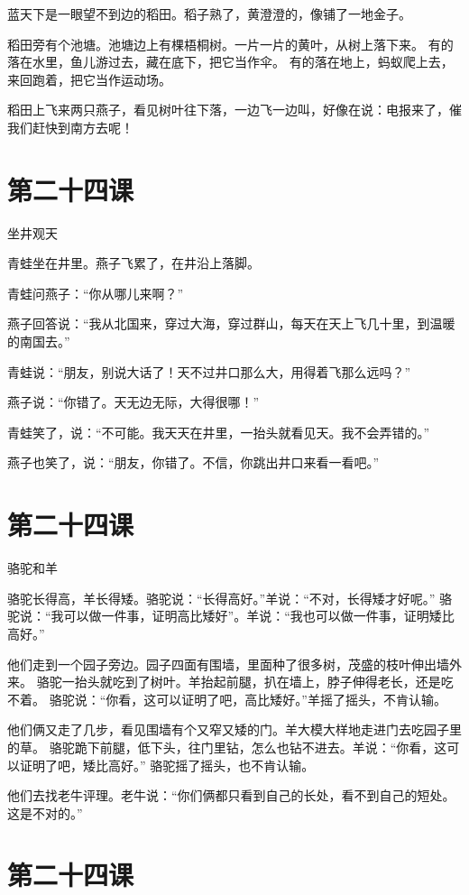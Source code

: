 \documentclass[12pt,UTF8]{ctexbook}
\begin{document}
蓝天下是一眼望不到边的稻田。稻子熟了，黄澄澄的，像铺了一地金子。

稻田旁有个池塘。池塘边上有棵梧桐树。一片一片的黄叶，从树上落下来。
有的落在水里，鱼儿游过去，藏在底下，把它当作伞。
有的落在地上，蚂蚁爬上去，来回跑着，把它当作运动场。

稻田上飞来两只燕子，看见树叶往下落，一边飞一边叫，好像在说：电报来了，催我们赶快到南方去呢！

\section{第二十四课}

坐井观天

青蛙坐在井里。燕子飞累了，在井沿上落脚。

青蛙问燕子：“你从哪儿来啊？”

燕子回答说：“我从北国来，穿过大海，穿过群山，每天在天上飞几十里，到温暖的南国去。”

青蛙说：“朋友，别说大话了！天不过井口那么大，用得着飞那么远吗？”

燕子说：“你错了。天无边无际，大得很哪！”

青蛙笑了，说：“不可能。我天天在井里，一抬头就看见天。我不会弄错的。”

燕子也笑了，说：“朋友，你错了。不信，你跳出井口来看一看吧。”

\section{第二十四课}

骆驼和羊

骆驼长得高，羊长得矮。骆驼说：“长得高好。”羊说：“不对，长得矮才好呢。”
骆驼说：“我可以做一件事，证明高比矮好”。羊说：“我也可以做一件事，证明矮比高好。”

他们走到一个园子旁边。园子四面有围墙，里面种了很多树，茂盛的枝叶伸出墙外来。
骆驼一抬头就吃到了树叶。羊抬起前腿，扒在墙上，脖子伸得老长，还是吃不着。
骆驼说：“你看，这可以证明了吧，高比矮好。”羊摇了摇头，不肯认输。

他们俩又走了几步，看见围墙有个又窄又矮的门。羊大模大样地走进门去吃园子里的草。
骆驼跪下前腿，低下头，往门里钻，怎么也钻不进去。羊说：“你看，这可以证明了吧，矮比高好。”
骆驼摇了摇头，也不肯认输。

他们去找老牛评理。老牛说：“你们俩都只看到自己的长处，看不到自己的短处。这是不对的。”

\section{第二十四课}
\end{document}
